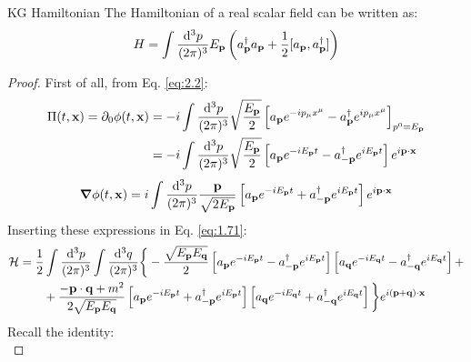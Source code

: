 \begin{proposition}{KG Hamiltonian}{}
  The Hamiltonian of a real scalar field can be written as:
  \begin{equation}
    H = \int \frac{\mathrm{d}^3 p}{(2\pi)^3} E_{\mathbf{p}} \left( a_{\mathbf{p}}^\dagger a_{\mathbf{p}} + \frac{1}{2} [a_{\mathbf{p}} , a_{\mathbf{p}}^\dagger] \right)
    \label{eq:2.7}
  \end{equation}

  \tcblower

  \begin{proof}
    First of all, from Eq. \ref{eq:2.2}:
    \begin{equation*}
      \begin{split}
        \Pi(t,\mathbf{x}) = \partial_0 \phi(t,\mathbf{x})
        &= -i \int \frac{\mathrm{d}^3 p}{(2\pi)^3} \sqrt{\frac{E_{\mathbf{p}}}{2}} \left[ a_{\mathbf{p}} e^{-i p_\mu x^\mu} - a_{\mathbf{p}}^\dagger e^{i p_\mu x^\mu} \right]_{p^0 = E_{\mathbf{p}}} \\
        &= -i \int \frac{\mathrm{d}^3 p}{(2\pi)^3} \sqrt{\frac{E_{\mathbf{p}}}{2}} \left[ a_{\mathbf{p}} e^{-i E_{\mathbf{p}} t} - a_{-\mathbf{p}}^\dagger e^{i E_{\mathbf{p}} t} \right] e^{i \mathbf{p} \cdot \mathbf{x}}
      \end{split}
    \end{equation*}
    \begin{equation*}
      \boldsymbol{\nabla} \phi(t,\mathbf{x}) = i \int \frac{\mathrm{d}^3 p}{(2\pi)^3} \frac{\mathbf{p}}{\sqrt{2E_{\mathbf{p}}}} \left[ a_{\mathbf{p}} e^{-i E_{\mathbf{p}} t} + a_{-\mathbf{p}}^\dagger e^{i E_{\mathbf{p}} t} \right] e^{i \mathbf{p} \cdot \mathbf{x}}
    \end{equation*}
    Inserting these expressions in Eq. \ref{eq:1.71}:
    \begin{equation*}
      \begin{split}
        \mathcal{H}
        &= \frac{1}{2} \int \frac{\mathrm{d}^3 p}{(2\pi)^3} \int \frac{\mathrm{d}^3 q}{(2\pi)^3} \bigg\{ - \frac{\sqrt{E_{\mathbf{p}} E_{\mathbf{q}}}}{2} \left[ a_{\mathbf{p}} e^{-i E_{\mathbf{p}} t} - a_{-\mathbf{p}}^\dagger e^{i E_{\mathbf{p}} t} \right] \left[ a_{\mathbf{q}} e^{-i E_{\mathbf{q}} t} - a_{-\mathbf{q}}^\dagger e^{i E_{\mathbf{q}} t} \right] + \\
        & \qquad + \frac{- \mathbf{p} \cdot \mathbf{q} + m^2}{2\sqrt{E_{\mathbf{p}} E_{\mathbf{q}}}} \left[ a_{\mathbf{p}} e^{-i E_{\mathbf{p}} t} + a_{-\mathbf{p}}^\dagger e^{i E_{\mathbf{p}} t} \right] \left[ a_{\mathbf{q}} e^{-i E_{\mathbf{q}} t} + a_{-\mathbf{q}}^\dagger e^{i E_{\mathbf{q}} t} \right] \bigg\} e^{i (\mathbf{p} + \mathbf{q}) \cdot \mathbf{x}}
      \end{split}
    \end{equation*}
    Recall the identity:
    \begin{equation}

\end{equation}
\end{proof}
\end{proposition}
